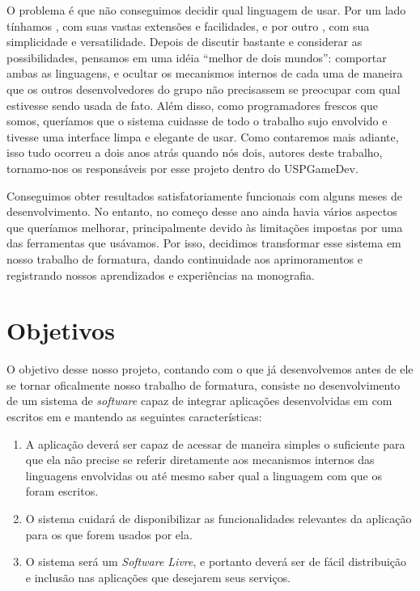 O problema é que não conseguimos decidir qual linguagem de \script{} usar.
Por um lado tínhamos , com suas vastas extensões e facilidades, e
por outro , com sua simplicidade e versatilidade. Depois de discutir
bastante e considerar as possibilidades, pensamos em uma idéia ``melhor de dois
mundos'': comportar ambas as linguagens, e ocultar os mecanismos internos de
cada uma de maneira que os outros desenvolvedores do grupo não precisassem se
preocupar com qual estivesse sendo usada de fato. Além disso, como programadores
frescos que somos, queríamos que o sistema cuidasse de todo o trabalho sujo
envolvido e tivesse uma interface limpa e elegante de usar. Como contaremos mais
adiante, isso tudo ocorreu a dois anos atrás quando nós dois, autores deste
trabalho, tornamo-nos os responsáveis por esse projeto dentro do USPGameDev.

Conseguimos obter resultados satisfatoriamente funcionais com alguns meses de
desenvolvimento. No entanto, no começo desse ano ainda havia vários aspectos que
queríamos melhorar, principalmente devido às limitações impostas por uma das
ferramentas que usávamos. Por isso, decidimos transformar esse sistema em nosso
trabalho de formatura, dando continuidade aos aprimoramentos e registrando
nossos aprendizados e experiências na monografia.

\section{Objetivos}
\label{sec:intr:objetivos}

  O objetivo desse nosso projeto, contando com o que já desenvolvemos antes de
  ele se tornar oficalmente nosso trabalho de formatura, consiste no
  desenvolvimento de um sistema de \textit{software} capaz de integrar
  aplicações desenvolvidas em \CXX{} com  escritos em  e
   mantendo as seguintes características:
  
  \begin{enumerate}

    \item A aplicação deverá ser capaz de acessar  de maneira simples
          o suficiente para que ela não precise se referir diretamente aos
          mecanismos internos das linguagens envolvidas ou até mesmo saber qual a
          linguagem com que os  foram escritos.
    \item O sistema cuidará de disponibilizar as funcionalidades relevantes da
          aplicação para os  que forem usados por ela.
    \item O sistema será um \textit{Software Livre}, e portanto deverá ser de
          fácil distribuição e inclusão nas aplicações que desejarem seus
          serviços.

  \end{enumerate}

